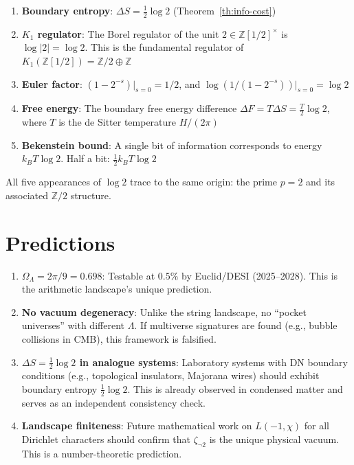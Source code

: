 \documentclass[11pt,a4paper]{article}
\begin{document}
\begin{enumerate}
\item \textbf{Boundary entropy}: $\Delta S = \frac{1}{2}\log 2$
(Theorem~\ref{th:info-cost})

\item \textbf{$K_1$ regulator}: The Borel regulator of the unit
$2 \in \mathbb{Z}[1/2]^\times$ is $\log|2| = \log 2$. This
is the fundamental regulator of $K_1(\mathbb{Z}[1/2]) =
\mathbb{Z}/2 \oplus \mathbb{Z}$~\cite{Milnor1971}

\item \textbf{Euler factor}: $(1 - 2^{-s})|_{s=0} = 1/2$, and
$\log(1/(1-2^{-s}))|_{s=0} = \log 2$

\item \textbf{Free energy}: The boundary free energy difference
$\Delta F = T \Delta S = \frac{T}{2}\log 2$, where $T$ is the
de Sitter temperature $H/(2\pi)$

\item \textbf{Bekenstein bound}: A single bit of information
corresponds to energy $k_BT\log 2$. Half a bit: $\frac{1}{2}k_BT\log 2$
\end{enumerate}

All five appearances of $\log 2$ trace to the same origin: the
prime $p = 2$ and its associated $\mathbb{Z}/2$ structure.

\section{Predictions}

\begin{enumerate}
\item \textbf{$\Omega_\Lambda = 2\pi/9 = 0.698$}: Testable at
$0.5\%$ by Euclid/DESI (2025--2028). This is the arithmetic
landscape's unique prediction.

\item \textbf{No vacuum degeneracy}: Unlike the string landscape,
no ``pocket universes'' with different $\Lambda$. If multiverse
signatures are found (e.g., bubble collisions in CMB), this
framework is falsified.

\item \textbf{$\Delta S = \frac{1}{2}\log 2$ in analogue systems}:
Laboratory systems with DN boundary conditions (e.g., topological
insulators, Majorana wires) should exhibit boundary entropy
$\frac{1}{2}\log 2$. This is already observed in condensed matter
and serves as an independent consistency check.

\item \textbf{Landscape finiteness}: Future mathematical work on
$L(-1, \chi)$ for all Dirichlet characters should confirm that
$\zeta_{\neg 2}$ is the unique physical vacuum. This is a
number-theoretic prediction.
\end{enumerate}
\end{document}
